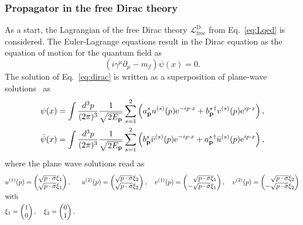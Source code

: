 \subsubsection*{Propagator in the free Dirac theory}
As a start, the Lagrangian of the free Dirac theory $\mathcal{L}_{\text{free}}^{\text{D}}$ from Eq.~\eqref{eq:Lqed} is considered. The Euler-Lagrange equations result in the Dirac equation as the equation of motion for the quantum field as
\begin{equation}
\label{eq:dirac}
\left( i\gamma^\mu \partial_\mu -m_f \right) \psi(x) = 0.
\end{equation}
The solution of Eq.~\eqref{eq:dirac} is written as a superposition of plane-wave solutions~\mbox{\cite[Section~3.3.]{peskin1995}} as
\begin{alignat}{2}
& \psi(x) = 
\int \frac{\mathrm{}d^3p}{(2\pi)^3}\frac{1}{\sqrt{2E_\mathbf{p}}} 
\sum_{s=1}^{2} \left(a^s_\mathbf{p}u^{(s)}(p) \text{e}^{-ip\cdot x} + b^{s\,\dagger}_{\mathbf{p}}v^{(s)}(p) \text{e}^{ip\cdot x} \right),\\
& \bar{\psi}(x) = 
\int \frac{\mathrm{}d^3p}{(2\pi)^3}\frac{1}{\sqrt{2E_\mathbf{p}}} 
\sum_{s=1}^{2} \left(b^s_\mathbf{p}\bar{v}^{(s)}(p) \text{e}^{-ip\cdot x} + a^{s\,\dagger}_{\mathbf{p}}\bar{u}^{(s)}(p) \text{e}^{ip\cdot x} \right),\\
\end{alignat}
where the plane wave solutions read as
\begin{alignat}{4}
& u^{(1)}(p)= \begin{pmatrix}\sqrt{p\cdot \sigma}\xi_1\\\sqrt{p\cdot \bar{\sigma}}\xi_1\end{pmatrix},\,&& 
u^{(2)}(p)= \begin{pmatrix}\sqrt{p\cdot \sigma}\xi_2\\\sqrt{p\cdot \bar{\sigma}}\xi_2\end{pmatrix},\,&& 
v^{(1)}(p)= \begin{pmatrix}\phantom{-}\sqrt{p\cdot \sigma}\xi_1\\-\sqrt{p\cdot \bar{\sigma}}\xi_1\end{pmatrix},\,&& 
v^{(2)}(p)= \begin{pmatrix}\phantom{-}\sqrt{p\cdot \sigma}\xi_2\\-\sqrt{p\cdot \bar{\sigma}}\xi_2\end{pmatrix}\notag\\
&\text{with}\\
&\xi_1=\begin{pmatrix}1\\0\end{pmatrix},\quad
\xi_2=\begin{pmatrix}0\\1\end{pmatrix}.\notag
\end{alignat}
